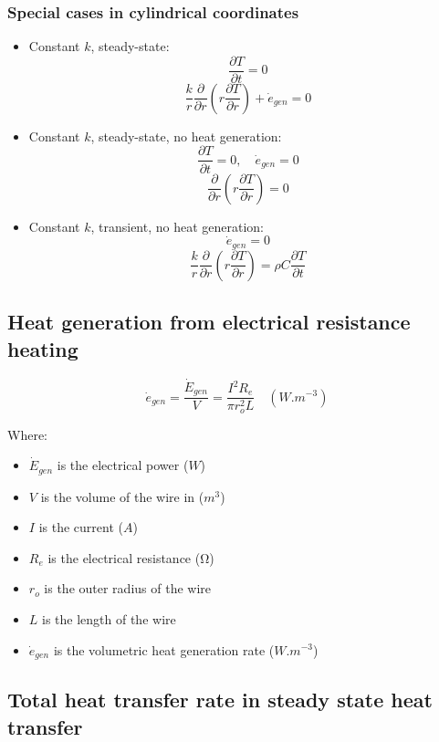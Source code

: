 \documentclass[11pt]{article}
\begin{document}
\subsubsection{Special cases in cylindrical coordinates}
\label{sec:org797c668}
\begin{itemize}
\item Constant \(k\), steady-state:
\[\frac{\partial T}{\partial t} = 0\]
\[\frac{k}{r} \frac{\partial}{\partial r} \left(r \frac{\partial T}{\partial r} \right) + \dot{e}_{gen} = 0\]
\item Constant \(k\), steady-state, no heat generation:
\[\frac{\partial T}{\partial t} = 0, \quad \dot{e}_{gen} = 0\]
\[\frac{\partial}{\partial r} \left(r \frac{\partial T}{\partial r} \right) = 0\]
\item Constant \(k\), transient, no heat generation:
\[\dot{e}_{gen} = 0\]
\[\frac{k}{r} \frac{\partial}{\partial r} \left(r \frac{\partial T}{\partial r} \right) = \rho C \frac{\partial T}{\partial t}\]
\end{itemize}

\subsection{Heat generation from electrical resistance heating}
\label{sec:org0bef406}
\[\dot{e}_{gen} = \frac{\dot{E}_{gen}}{V} = \frac{I^2 R_e}{\pi r_o^2 L} \quad (\unit{W.m^{-3}})\]

Where:
\begin{itemize}
\item \(\dot{E}_{gen}\) is the electrical power (\(\unit{W}\))
\item \(V\) is the volume of the wire in (\(\unit{m^3}\))
\item \(I\) is the current (\(\unit{A}\))
\item \(R_e\) is the electrical resistance (\(\unit{\ohm}\))
\item \(r_o\) is the outer radius of the wire
\item \(L\) is the length of the wire
\item \(\dot{e}_{gen}\) is the volumetric heat generation rate (\(\unit{W.m^{-3}}\))
\end{itemize}

\subsection{Total heat transfer rate in steady state heat transfer}
\label{sec:org3c46f4f}
\end{document}
